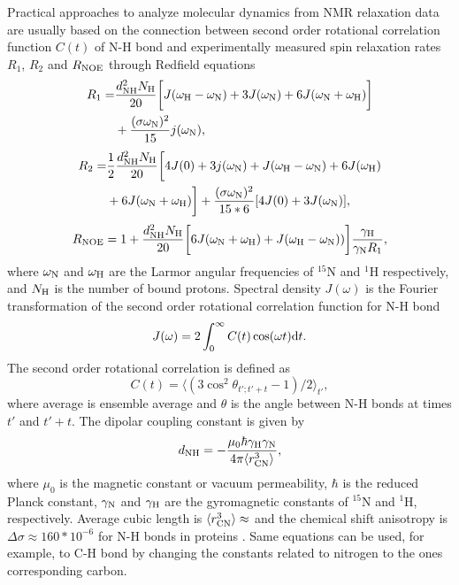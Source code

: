 \documentclass[pre,aps,floatfix,authordate1-4,twocolumn]{revtex4-1}
\begin{document}
Practical approaches to analyze molecular dynamics from
NMR relaxation data are usually based on the connection between
second order rotational correlation function $C(t)$ of N-H bond
and experimentally measured spin relaxation rates $R_1$, $R_2$
and $R_{\rm NOE}$ through Redfield equations \cite{abragam,kay89}
\begin{equation}\label{R1}
  \begin{aligned}
  R_{1}= & \frac{d_{\rm{NH}}^2N_{\rm{H}}}{20}\bigg[J(\omega_{\rm{H}}-\omega_{\rm{N}})+3J(\omega_{\rm{N}})+6J(\omega_{\rm{N}}+\omega_{\rm{H}})\bigg] \\
        & +\frac{(\sigma \omega_{\rm{N}})^2}{15}j(\omega_{\rm{N}}),
  \end{aligned}
\end{equation}
\begin{equation}\label{R2}
    \begin{aligned}
  R_{2}= & \frac{1}{2}\frac{d_{\rm{NH}}^2N_{\rm{H}}}{20}\bigg[4J(0)+3j(\omega_{\rm{N}})+J(\omega_{\rm{H}}-\omega_{\rm{N}})+6J(\omega_{\rm{H}})  \\
    & +6J(\omega_{\rm{N}}+\omega_{\rm{H}})\bigg]+\frac{(\sigma \omega_{\rm{N}})^2}{15*6}[4J(0) +3J(\omega_{\rm{N}})],
    \end{aligned}
\end{equation}
\begin{equation}\label{NOE}
R_{\rm NOE}=1+\frac{d_{\rm{NH}}^2N_{\rm{H}}}{20}\bigg[6J(\omega_{\rm{N}}+\omega_{\rm{H}})+J(\omega_{\rm{H}}-\omega_{\rm{N}}))\bigg]\frac{\gamma_{\rm{H}}}{\gamma_{\rm{N}}R_1},
\end{equation}
where $\omega_{\rm{N}}$ and $\omega_{\rm{H}}$ are the Larmor angular
frequencies of $^{15}$N and $^1$H respectively, and
$N_{\rm{H}}$ is the number of bound protons.
Spectral density $J(\omega)$ is the Fourier transformation of the second order
rotational correlation function for N-H bond
\begin{equation}\label{SPECTdens}
  J(\omega)=2\int_0^\infty C(t) \cos(\omega t) {\rm d}t.
\end{equation}
The second order rotational correlation is defined as
\begin{equation}\label{CORRFdef}
  C(t)=\langle (3\cos^2\theta_{t';t'+t}-1)/2 \rangle_{t'},
\end{equation}
where average is ensemble average and $\theta$ is the angle between N-H bonds at times $t'$ and $t'+t$.
The dipolar coupling constant is given by
\begin{equation}
d_{\rm{NH}}=-\frac{\mu_0\hbar\gamma_{\rm{H}}\gamma_{\rm{N}}}{4\pi\langle r_{\rm{CN}}^3\rangle},\nonumber
\end{equation}
where $\mu_0$ is the magnetic constant or vacuum permeability, $\hbar$ is the reduced Planck constant,
$\gamma_{\rm{N}}$ and $\gamma_{\rm{H}}$ are the gyromagnetic constants of $^{15}$N and $^1$H, respectively.
Average cubic length is $\langle r_{\rm{CN}}^3\rangle \approx$ and the 
chemical shift anisotropy is $\Delta \sigma \approx 160*10^{-6}$ for N-H bonds in proteins \cite{??}.
Same equations can be used, for example, to C-H bond by changing the
constants related to nitrogen to the ones corresponding carbon. 
\end{document}

